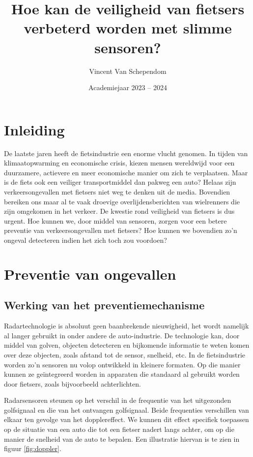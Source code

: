\documentclass[kulak]{kulakarticle} %
\title{Hoe kan de veiligheid van fietsers verbeterd worden met slimme sensoren?}
\author{Vincent Van Schependom}
\date{Academiejaar 2023 -- 2024}
\begin{document}
\maketitle

\section*{Inleiding}

De laatste jaren heeft de fietsindustrie een enorme vlucht genomen. In tijden van klimaatopwarming en economische crisis, kiezen mensen wereldwijd voor een duurzamere, actievere en meer economische manier om zich te verplaatsen. Maar is de fiets ook een veiliger transportmiddel dan pakweg een auto? Helaas zijn verkeersongevallen met fietsers niet weg te denken uit de media. Bovendien bereiken ons maar al te vaak droevige overlijdensberichten van wielrenners die zijn omgekomen in het verkeer. De kwestie rond veiligheid van fietsers is dus urgent. Hoe kunnen we, door middel van sensoren, zorgen voor een betere  preventie van verkeersongevallen met fietsers? Hoe kunnen we bovendien zo'n ongeval detecteren indien het zich toch zou voordoen?

\section{Preventie van ongevallen}

\subsection{Werking van het preventiemechanisme}

Radartechnologie is absoluut geen baanbrekende nieuwigheid, het wordt namelijk al langer gebruikt in onder andere de auto-industrie. De technologie kan, door middel van golven, objecten detecteren en bijkomende informatie te weten komen over deze objecten, zoals afstand tot de sensor, snelheid, etc. In de fietsindustrie worden zo'n sensoren nu volop ontwikkeld in kleinere formaten. Op die manier kunnen ze geïntegreerd worden in apparaten die standaard al gebruikt worden door fietsers, zoals bijvoorbeeld achterlichten.

Radarsensoren steunen op het verschil in de frequentie van het uitgezonden golfsignaal en die van het ontvangen golfsignaal. Beide frequenties verschillen van elkaar ten gevolge van het dopplereffect. We kunnen dit effect specifiek toepassen op de situatie van een auto die tot een fietser nadert langs achter, om op die manier de snelheid van de auto te bepalen. Een illustratie hiervan is te zien in figuur \ref{fig:doppler}.
\end{document}
